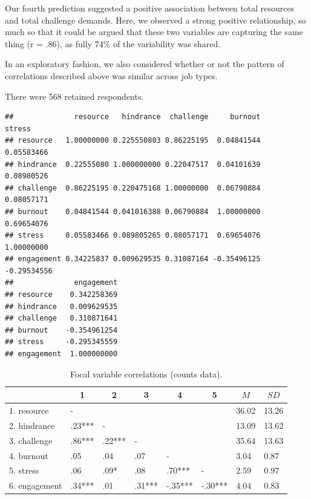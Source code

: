 \documentclass[
  man]{apa6}
\begin{document}
Our fourth prediction suggested a positive association between total resources and total challenge demands. Here, we observed a strong positive relationship, so much so that it could be argued that these two variables are capturing the same thing (r = .86), as fully 74\% of the variability was shared.

In an exploratory fashion, we also considered whether or not the pattern of correlations described above was similar across job types.

There were 568 retained respondents.

\begin{verbatim}
##              resource   hindrance  challenge     burnout      stress
## resource   1.00000000 0.225550803 0.86225195  0.04841544  0.05583466
## hindrance  0.22555080 1.000000000 0.22047517  0.04101639  0.08980526
## challenge  0.86225195 0.220475168 1.00000000  0.06790884  0.08057171
## burnout    0.04841544 0.041016388 0.06790884  1.00000000  0.69654076
## stress     0.05583466 0.089805265 0.08057171  0.69654076  1.00000000
## engagement 0.34225837 0.009629535 0.31087164 -0.35496125 -0.29534556
##              engagement
## resource    0.342258369
## hindrance   0.009629535
## challenge   0.310871641
## burnout    -0.354961254
## stress     -0.295345559
## engagement  1.000000000
\end{verbatim}

\begin{table}[tbp]

\begin{center}
\begin{threeparttable}

\caption{\label{tab:correlation_table}Focal variable correlations (counts data).}

\begin{tabular}{llllllll}
\toprule
 & \multicolumn{1}{c}{1} & \multicolumn{1}{c}{2} & \multicolumn{1}{c}{3} & \multicolumn{1}{c}{4} & \multicolumn{1}{c}{5} & \multicolumn{1}{c}{$M$} & \multicolumn{1}{c}{$SD$}\\
\midrule
1. resource & - &  &  &  &  & 36.02 & 13.26\\
2. hindrance & .23*** & - &  &  &  & 13.09 & 13.62\\
3. challenge & .86*** & .22*** & - &  &  & 35.64 & 13.63\\
4. burnout & .05 & .04 & .07 & - &  & 3.04 & 0.87\\
5. stress & .06 & .09* & .08 & .70*** & - & 2.59 & 0.97\\
6. engagement & .34*** & .01 & .31*** & -.35*** & -.30*** & 4.04 & 0.83\\
\bottomrule
\end{tabular}

\end{threeparttable}
\end{center}

\end{table}
\end{document}
